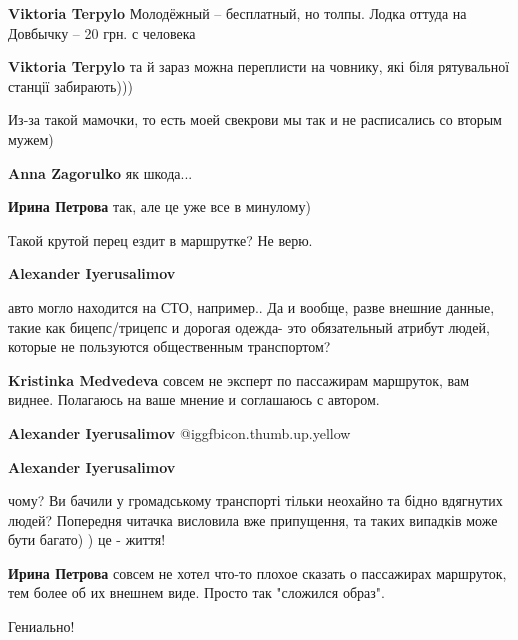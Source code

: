 \begin{itemize}
\begin{itemize}
\textbf{Viktoria Terpylo} Молодёжный – бесплатный, но толпы. Лодка оттуда на Довбычку – 20 грн. с человека

\textbf{Viktoria Terpylo} та й зараз можна переплисти на човнику, які біля рятувальної станції забирають)))
\end{itemize} %

Из-за такой мамочки, то есть моей свекрови мы так и не расписались со вторым мужем)

\begin{itemize} %
\textbf{Anna Zagorulko} як шкода...

\textbf{Ирина Петрова} так, але це уже все в минулому)
\end{itemize} %

Такой крутой перец ездит в маршрутке? Не верю.

\begin{itemize} %
\textbf{Alexander Iyerusalimov} 

авто могло находится на СТО, например.. Да и вообще, разве внешние данные, такие
как бицепс/трицепс и дорогая одежда- это обязательный атрибут людей, которые не
пользуются общественным транспортом?

\begin{itemize} %
\textbf{Kristinka Medvedeva} совсем не эксперт по пассажирам маршруток, вам виднее. Полагаюсь на ваше мнение и соглашаюсь с автором.

\textbf{Alexander Iyerusalimov}  @igg{fbicon.thumb.up.yellow} 
\end{itemize} %

\textbf{Alexander Iyerusalimov} 

чому? Ви бачили у громадському транспорті тільки неохайно та бідно вдягнутих
людей? Попередня читачка висловила вже припущення, та таких випадків може бути
багато) ) це - життя!

\begin{itemize} %
\textbf{Ирина Петрова} совсем не хотел что-то плохое сказать о пассажирах маршруток, тем более об их внешнем виде.
Просто так "сложился образ".
\end{itemize} %

\end{itemize} %

Гениально!


\end{itemize}
